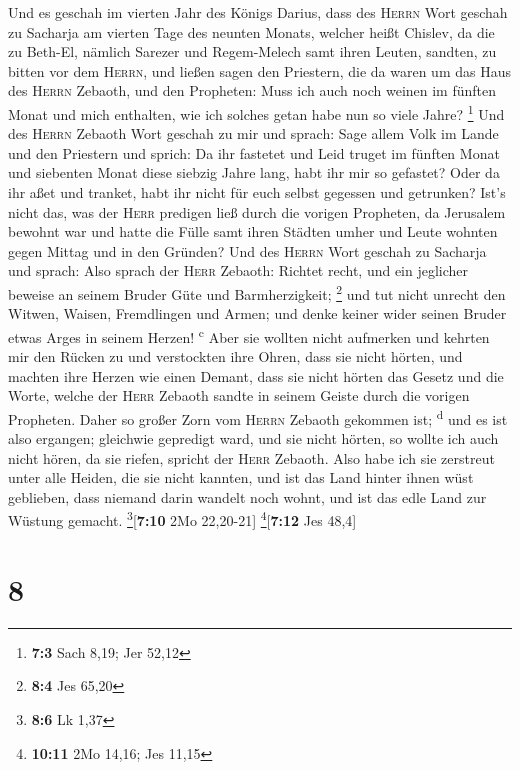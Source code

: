  Und es geschah im vierten Jahr des Königs Darius, dass
des \textsc{Herrn} Wort geschah zu Sacharja am vierten Tage des neunten
Monats, welcher heißt Chislev,  da die zu Beth-El, nämlich
Sarezer und Regem-Melech samt ihren Leuten, sandten, zu bitten vor dem
\textsc{Herrn},  und ließen sagen den Priestern, die da
waren um das Haus des \textsc{Herrn} Zebaoth, und den Propheten: Muss
ich auch noch weinen im fünften Monat und mich enthalten, wie ich
solches getan habe nun so viele Jahre? \footnote{\textbf{7:3} Sach 8,19;
  Jer 52,12}  Und des \textsc{Herrn} Zebaoth Wort geschah
zu mir und sprach:  Sage allem Volk im Lande und den
Priestern und sprich: Da ihr fastetet und Leid truget im fünften Monat
und siebenten Monat diese siebzig Jahre lang, habt ihr mir so gefastet?
 Oder da ihr aßet und tranket, habt ihr nicht für euch
selbst gegessen und getrunken?  Ist's nicht das, was der
\textsc{Herr} predigen ließ durch die vorigen Propheten, da Jerusalem
bewohnt war und hatte die Fülle samt ihren Städten umher und Leute
wohnten gegen Mittag und in den Gründen?  Und des
\textsc{Herrn} Wort geschah zu Sacharja und sprach:  Also
sprach der \textsc{Herr} Zebaoth: Richtet recht, und ein jeglicher
beweise an seinem Bruder Güte und Barmherzigkeit; \footnote{\textbf{8:4}
  Jes 65,20}  und tut nicht unrecht den Witwen, Waisen,
Fremdlingen und Armen; und denke keiner wider seinen Bruder etwas Arges
in seinem Herzen! \textsuperscript{c}  Aber sie wollten
nicht aufmerken und kehrten mir den Rücken zu und verstockten ihre
Ohren, dass sie nicht hörten,  und machten ihre Herzen
wie einen Demant, dass sie nicht hörten das Gesetz und die Worte, welche
der \textsc{Herr} Zebaoth sandte in seinem Geiste durch die vorigen
Propheten. Daher so großer Zorn vom \textsc{Herrn} Zebaoth gekommen ist;
\textsuperscript{d}  und es ist also ergangen; gleichwie
gepredigt ward, und sie nicht hörten, so wollte ich auch nicht hören, da
sie riefen, spricht der \textsc{Herr} Zebaoth.  Also habe
ich sie zerstreut unter alle Heiden, die sie nicht kannten, und ist das
Land hinter ihnen wüst geblieben, dass niemand darin wandelt noch wohnt,
und ist das edle Land zur Wüstung gemacht. \footnote{\textbf{8:6} Lk
  1,37}{[}\textbf{7:10} 2Mo 22,20-21{]} \footnote{\textbf{10:11} 2Mo
  14,16; Jes 11,15}{[}\textbf{7:12} Jes 48,4{]}

\hypertarget{section-7}{%
\section{8}\label{section-7}}

